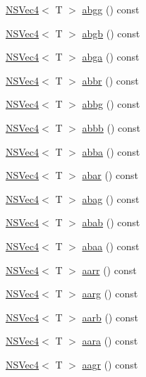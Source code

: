 \begin{DoxyCompactItemize}
\item 
\hyperlink{structNSVec4}{N\-S\-Vec4}$<$ T $>$ \hyperlink{structNSVec4_afb43e96380ed6f2bc43c06cad58fa61e}{abgg} () const 
\item 
\hyperlink{structNSVec4}{N\-S\-Vec4}$<$ T $>$ \hyperlink{structNSVec4_a5ae47e2ce249a47b9e3721007b1a7a9f}{abgb} () const 
\item 
\hyperlink{structNSVec4}{N\-S\-Vec4}$<$ T $>$ \hyperlink{structNSVec4_ad287640436307fb283dcb9849223c9db}{abga} () const 
\item 
\hyperlink{structNSVec4}{N\-S\-Vec4}$<$ T $>$ \hyperlink{structNSVec4_ad44818173917f8e8a7f8c9752d09153b}{abbr} () const 
\item 
\hyperlink{structNSVec4}{N\-S\-Vec4}$<$ T $>$ \hyperlink{structNSVec4_aac08a3d068e8afc6e8cc5a0e64e972ad}{abbg} () const 
\item 
\hyperlink{structNSVec4}{N\-S\-Vec4}$<$ T $>$ \hyperlink{structNSVec4_a3bfd3dd194bf0613b8531298449b7b19}{abbb} () const 
\item 
\hyperlink{structNSVec4}{N\-S\-Vec4}$<$ T $>$ \hyperlink{structNSVec4_a8e0b6b595211417ea3cd44b7d3e49528}{abba} () const 
\item 
\hyperlink{structNSVec4}{N\-S\-Vec4}$<$ T $>$ \hyperlink{structNSVec4_ad0928fc696032d9a45e2c991fcc28cd4}{abar} () const 
\item 
\hyperlink{structNSVec4}{N\-S\-Vec4}$<$ T $>$ \hyperlink{structNSVec4_a6d81d9b79ff18b757c1b21d55d814c61}{abag} () const 
\item 
\hyperlink{structNSVec4}{N\-S\-Vec4}$<$ T $>$ \hyperlink{structNSVec4_a5def87eb71223039552235af636080b9}{abab} () const 
\item 
\hyperlink{structNSVec4}{N\-S\-Vec4}$<$ T $>$ \hyperlink{structNSVec4_a64e758b4a7a8690c6eb8f35cd14b9a85}{abaa} () const 
\item 
\hyperlink{structNSVec4}{N\-S\-Vec4}$<$ T $>$ \hyperlink{structNSVec4_ae096bf92442303fcc1c7acae474d90cb}{aarr} () const 
\item 
\hyperlink{structNSVec4}{N\-S\-Vec4}$<$ T $>$ \hyperlink{structNSVec4_a1fd5e6ac88d906c68ca61d0324cb8bec}{aarg} () const 
\item 
\hyperlink{structNSVec4}{N\-S\-Vec4}$<$ T $>$ \hyperlink{structNSVec4_a83b4b95c84ab8a875150ec027ea6cd94}{aarb} () const 
\item 
\hyperlink{structNSVec4}{N\-S\-Vec4}$<$ T $>$ \hyperlink{structNSVec4_a54ca9d61a3e2cfc41eedfa20e06d97c7}{aara} () const 
\item 
\hyperlink{structNSVec4}{N\-S\-Vec4}$<$ T $>$ \hyperlink{structNSVec4_a6f41535f5df381ae866a256ebd7f2893}{aagr} () const 

\end{DoxyCompactItemize}
